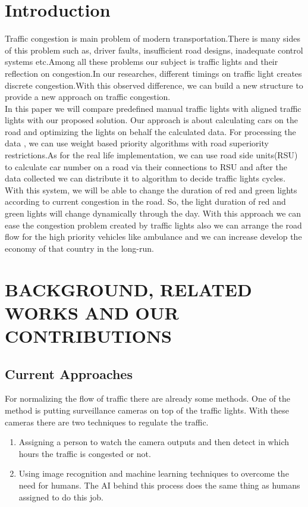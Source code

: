 \documentclass[conference]{IEEEtran}
\begin{document}
\section{Introduction}
Traffic congestion is main problem of modern transportation.There is many sides of this problem such as, driver faults, insufficient road designs,  inadequate control systems etc.Among all these problems our subject is traffic lights and their reflection on congestion.In our researches, different timings on traffic light creates discrete congestion.With this observed difference, we can build a new structure to provide a new approach on traffic congestion.
\\
In this paper we will compare predefined manual traffic lights with aligned traffic lights with our proposed solution. 
Our approach is about calculating cars on the road and optimizing the lights on behalf the calculated data. For processing the data , we can use weight based priority algorithms with road superiority restrictions.As for the real life implementation, we can use road side units(RSU) to calculate car number on a road via their connections to RSU and after the data collected we can distribute it to algorithm to decide traffic lights cycles. With this system, we will be able to change the duration of red and green lights according to current congestion in the road. So, the light duration of red and green lights will change dynamically through the day. With this approach we can ease the congestion problem created by traffic lights also we can arrange the road flow for the high priority vehicles like ambulance and we can increase develop the economy of that country in the long-run. 


\section{BACKGROUND, RELATED WORKS AND OUR CONTRIBUTIONS}

\subsection{Current Approaches}

For normalizing the flow of traffic there are already some methods. One of the method is putting surveillance cameras on top of the traffic lights. With these cameras there are two techniques to regulate the traffic.
\begin{enumerate}
	\item Assigning a person to watch the camera outputs and then detect in which hours the traffic is congested or not.
	\item Using image recognition and machine learning techniques to overcome the need for humans. The AI behind this process does the same thing as humans assigned to do this job.
\end{enumerate}
\end{document}

